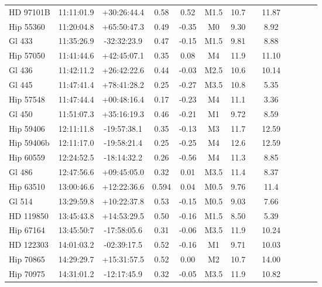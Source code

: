\begin{landscape}
{\begin{longtable}{l|cccccccccccc}
   HD 97101B & 11:11:01.9 & +30:26:44.4 & 0.58 & 0.52 & M1.5 & 10.7 & \citet{Hog00} & 11.87 \\
  Hip 55360 & 11:20:04.8 & +65:50:47.3 & 0.49 & -0.35 & M0 &  9.30 & \citet{Hog00} & 8.92  \\ 
     Gl 433 & 11:35:26.9 & -32:32:23.9 & 0.47 & -0.15 & M1.5 &  9.81 & \citet{Koen10} &  8.88    \\ 
  Hip 57050 & 11:41:44.6 & +42:45:07.1 & 0.35 & 0.08 & M4 & 11.9 & \citet{Kharchenko01} & 11.10  \\ 
  Gl 436 & 11:42:11.2 & +26:42:22.6 &  0.44 & -0.03 & M2.5 & 10.6 & \citet{Hog00} & 10.14   \\ 
     Gl 445 & 11:47:41.4 & +78:41:28.2 & 0.25 & -0.27 & M3.5 & 10.8 & \citet{Hog00} &  5.35  \\ 
 Hip 57548 & 11:47:44.4 & +00:48:16.4 & 0.17 & -0.23 & M4 & 11.1 & \citet{Landolt92} & 3.36 \\
     Gl 450 & 11:51:07.3 & +35:16:19.3 & 0.46 & -0.21 & M1 & 9.72 & \citet{Hog00} &  8.59  \\ 
  Hip 59406 & 12:11:11.8 & -19:57:38.1 & 0.35 & -0.13 & M3 & 11.7 & \citet{Koen10} & 12.59 \\ 
  Hip 59406b & 12:11:17.0 & -19:58:21.4 & 0.25 & -0.25 & M4 & 12.6 & \citet{Gliese91}  & 12.59  \\
  Hip 60559 & 12:24:52.5 & -18:14:32.2 & 0.26 & -0.56 & M4 & 11.3 & \citet{Koen10} & 8.85  \\
     Gl 486 & 12:47:56.6 & +09:45:05.0 & 0.32 & 0.01 & M3.5 &  11.4 & \citet{Koen10} &  8.37  \\ 
  Hip 63510 & 13:00:46.6 & +12:22:36.6 & 0.594 & 0.04 & M0.5 & 9.76 & \citet{Koen10} & 11.4  \\ 
     Gl 514 & 13:29:59.8 & +10:22:37.8 & 0.53 & -0.15 & M0.5 & 9.03 & \citet{Koen10} &  7.66  \\ 
   HD 119850 & 13:45:43.8 & +14:53:29.5 & 0.50 & -0.16 & M1.5 & 8.50 & \citet{VanBelle09} &  5.39 \\
  Hip 67164 & 13:45:50:7 & -17:58:05.6 & 0.31 & -0.06 & M3.5 & 11.9 & \citet{Koen10} & 10.24  \\ 
   HD 122303 & 14:01:03.2 & -02:39:17.5 & 0.52 & -0.16 & M1 & 9.71 & \citet{Koen10} & 10.03    \\ 
  Hip 70865 & 14:29:29.7 & +15:31:57.5 & 0.52 & 0.00 & M2 & 10.7 & \citet{Koen10} & 14.00 \\
  Hip 70975 & 14:31:01.2 & -12:17:45.9 & 0.32 & -0.05 & M3.5 & 11.9 & \citet{Koen10} & 10.82  \\ 

\end{longtable}}
\end{landscape}
